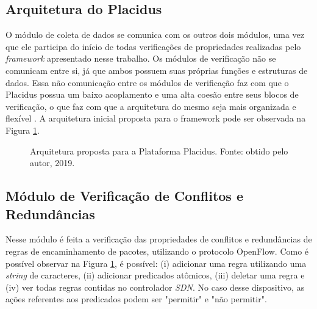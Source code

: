 \documentclass[12pt]{article}
\begin{document}
\subsection{Arquitetura do Placidus}
O módulo de coleta de dados se comunica com os outros dois módulos, uma vez que ele participa do início de todas verificações de propriedades realizadas pelo \textit{framework} apresentado nesse trabalho.
Os módulos de verificação não se comunicam entre si, já que ambos possuem suas próprias funções e estruturas de dados.
Essa não comunicação entre os módulos de verificação faz com que o Placidus possua um baixo acoplamento e uma alta coesão entre seus blocos de verificação, o que faz com que a arquitetura do mesmo seja mais organizada e flexível \cite{5229862}.
A arquitetura inicial proposta para o framework pode ser observada na Figura \ref{fig:ArquiteturaPlacidus}.

 \begin{figure}[!ht]
     \centering
     \caption{Arquitetura proposta para a Plataforma Placidus. Fonte: obtido pelo autor, 2019.}
     \label{fig:ArquiteturaPlacidus}
 \end{figure}

\subsection{Módulo de Verificação de Conflitos e Redundâncias} 
Nesse módulo é feita a verificação  das propriedades de conflitos e redundâncias de regras de encaminhamento de pacotes, utilizando o protocolo OpenFlow.
Como é possível observar na Figura \ref{fig:ArquiteturaPlacidus}, é possível: (i) adicionar uma regra utilizando uma \textit{string} de caracteres, (ii) adicionar predicados atômicos, (iii) deletar uma regra e (iv) ver todas regras contidas no controlador \textit{SDN}.
No caso desse dispositivo, as ações referentes aos predicados podem ser "permitir" e "não permitir".
\end{document}
